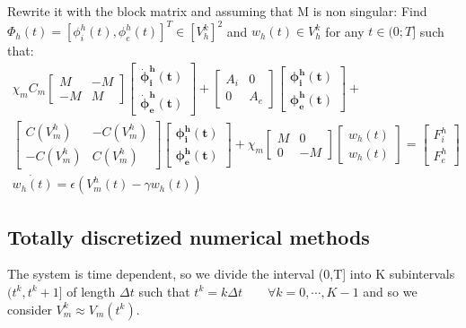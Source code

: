 \documentclass[a4paper,12pt]{article}
\begin{document}
 Rewrite it with the block matrix and assuming that M is non singular:
 \newline
 Find $\Phi_h(t)=[\phi_i^h(t),\phi_e^h(t)]^T \in [V_h^k]^2$ and $w_h(t) \in V_h^k$ for any $t \in (0;T]$ such that:
 \begin{equation}\label{block_matrix}
 \begin{gathered}
 \chi_mC_m \begin{bmatrix}M &-M \\ -M & M \end{bmatrix}
	\begin{bmatrix}\bm{\dot{\phi}_i^h(t)} \\ \bm{\dot{\phi}_e^h(t)} \end{bmatrix}
	 + \begin{bmatrix}A_i & 0 \\ 0 & A_e \end{bmatrix}
	 \begin{bmatrix}\bm{\phi_i^h(t)} \\ \bm{\phi_e^h(t)} \end{bmatrix} +\\
	   \begin{bmatrix}C(V_m^h) & -C(V_m^h) \\ -C(V_m^h) & C(V_m^h) \end{bmatrix} 
	   \begin{bmatrix} \bm{\phi_i^h(t)} \\ \bm{\phi_e^h(t)}  \end{bmatrix} 
	   +\chi_m \begin{bmatrix}M & 0 \\ 0 & -M \end{bmatrix} 
	   	\begin{bmatrix}w_h(t) \\ w_h(t) \end{bmatrix} = 
	   	\begin{bmatrix} F_i^h \\ F_e^h\end{bmatrix}\\
	   \dot{w_h(t)}=\epsilon (V_m^h(t)-\gamma w_h(t))
\end{gathered}
\end{equation}

\subsection{Totally discretized numerical methods}
The system is time dependent, so we divide the interval (0,T] into K subintervals $(t^k,t^k+1]$ of length $\Delta t$ such that $t^k=k \Delta t \qquad \forall k=0,\cdots,K-1$ and so we consider $V_m^k\approx V_m(t^k)$.
\end{document}
